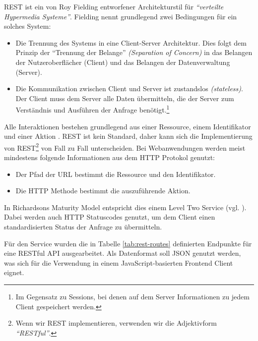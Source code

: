 \ac{REST} ist ein von Roy Fielding entworfener Architekturstil für \emph{``verteilte Hypermedia Systeme''}. Fielding nennt grundlegend zwei Bedingungen für ein solches System:

\begin{itemize}
  \item Die Trennung des Systems in eine Client-Server Architektur. Dies folgt dem Prinzip der ``Trennung der Belange'' \emph{(Separation of Concern)} in das Belangen der Nutzeroberflächer (Client) und das Belangen der Datenverwaltung (Server).
  \item Die Kommunikation zwischen Client und Server ist zustandslos \emph{(stateless)}. Der Client muss dem Server alle Daten übermitteln, die der Server zum Verständnis und Ausführen der Anfrage benötigt.\footnote{Im Gegensatz zu Sessions, bei denen auf dem Server Informationen zu jedem Client gespeichert werden.}
\end{itemize}

Alle Interaktionen bestehen grundlegend aus einer Ressource, einem Identifikator und einer Aktion \citep[12]{Webber2010}. REST ist kein Standard, daher kann sich die Implementierung von REST\footnote{Wenn wir REST implementieren, verwenden wir die Adjektivform \emph{``RESTful''}.} von Fall zu Fall unterscheiden. Bei Webanwendungen werden meist mindestens folgende Informationen aus dem HTTP Protokol genutzt:

\begin{itemize}
  \item Der Pfad der URL bestimmt die Ressource und den Identifikator.
  \item Die HTTP Methode bestimmt die auszuführende Aktion.
\end{itemize}

In Richardsons Maturity Model entspricht dies einem Level Two Service (vgl. \citep[20]{Webber2010}). Dabei werden auch HTTP Statuscodes genutzt, um dem Client einen standardisierten Status der Anfrage zu übermitteln.

Für den Service wurden die in Tabelle \ref{tab:rest-routes} definierten Endpunkte für eine RESTful API ausgearbeitet. Als Datenformat soll JSON genutzt werden, was sich für die Verwendung in einem JavaScript-basierten Frontend Client eignet.

